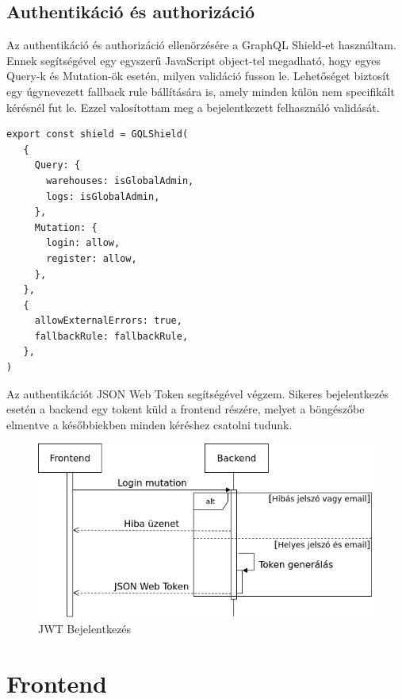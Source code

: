 \subsection{Authentikáció és authorizáció}
Az authentikáció és authorizáció ellenörzésére a GraphQL Shield-et használtam. 
Ennek segítségével egy egyszerű JavaScript object-tel megadható, hogy egyes Query-k és Mutation-ök esetén, milyen validáció fusson le.
Lehetőséget biztosít egy úgynevezett fallback rule bállítására is, amely minden külön nem specifikált kérésnél fut le.
Ezzel valosítottam meg a bejelentkezett felhasználó validását.

\begin{lstlisting}[style=ES6, caption={GraphQL Shield}]
export const shield = GQLShield(
   {
     Query: {
       warehouses: isGlobalAdmin,
       logs: isGlobalAdmin,
     },
     Mutation: {
       login: allow,
       register: allow,
     },
   },
   {
     allowExternalErrors: true,
     fallbackRule: fallbackRule,
   },
)
\end{lstlisting}

Az authentikációt JSON Web Token segítségével végzem. 
Sikeres bejelentkezés esetén a backend egy tokent küld a frontend részére, melyet a böngészőbe elmentve a későbbiekben minden kéréshez csatolni tudunk.

\begin{figure}[!ht]
  \centering
  \includegraphics[width=150mm, keepaspectratio]{figures/login.png}
  \caption{JWT Bejelentkezés}
  \label{fig:JWT}
\end{figure}


\section{Frontend}

